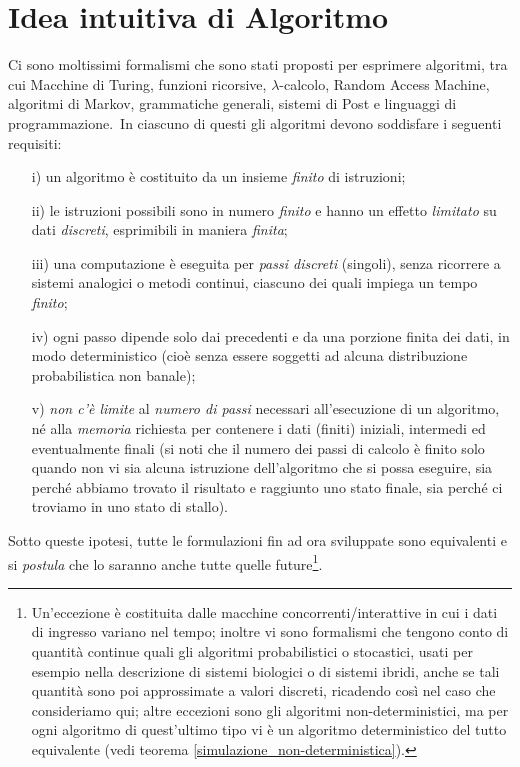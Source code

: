 \section{Idea intuitiva di Algoritmo}

Ci sono moltissimi formalismi che sono stati proposti per esprimere algoritmi, tra cui Macchine di Turing, funzioni ricorsive, $\lambda$-calcolo, Random Access Machine, algoritmi di Markov, grammatiche generali, sistemi di Post e linguaggi di programmazione.\
In ciascuno di questi gli algoritmi devono soddisfare i seguenti requisiti:

\begin{itemize}
    \item[i)] un algoritmo è costituito da un insieme \textit{finito} di istruzioni;
    \item[ii)] le istruzioni possibili sono in numero \textit{finito} e hanno un effetto \textit{limitato} su dati \textit{discreti}, esprimibili in maniera \textit{finita};
    \item[iii)] una computazione è eseguita per \textit{passi discreti} (singoli), senza ricorrere a sistemi analogici o metodi continui, ciascuno dei quali impiega un tempo \textit{finito};
    \item[iv)] ogni passo dipende solo dai precedenti e da una porzione finita dei dati, in modo deterministico (cioè senza essere soggetti ad alcuna distribuzione probabilistica non banale);
    \item[v)] \textit{non c'è limite} al \textit{numero di passi} necessari all'esecuzione di un algoritmo, né alla \textit{memoria} richiesta per contenere i dati (finiti) iniziali, intermedi ed eventualmente finali (si noti che il numero dei passi di calcolo è finito solo quando non vi sia alcuna istruzione dell'algoritmo che si possa eseguire, sia perché abbiamo trovato il risultato e raggiunto uno stato finale, sia perché ci troviamo in uno stato di stallo).
\end{itemize}

\noindent Sotto queste ipotesi, tutte le formulazioni fin ad ora sviluppate sono equivalenti e si \textit{postula} che lo saranno anche tutte quelle future\footnote{Un'eccezione è costituita dalle macchine concorrenti/interattive in cui i dati di ingresso variano nel tempo; inoltre vi sono formalismi che tengono conto di quantità continue quali gli algoritmi probabilistici o stocastici, usati per esempio nella descrizione di sistemi biologici o di sistemi ibridi, anche se tali quantità sono poi approssimate a valori discreti, ricadendo così nel caso che consideriamo qui; altre eccezioni sono gli algoritmi non-deterministici, ma per ogni algoritmo di quest'ultimo tipo vi è un algoritmo deterministico del tutto equivalente (vedi teorema \ref{simulazione_non-deterministica}).}.
